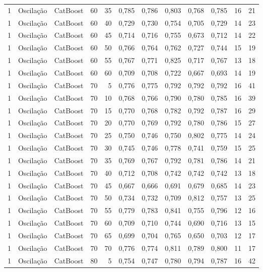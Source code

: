 \begin{longtable}{@{}rllrrrrrrrrr@{}}
1 & Oscilação & CatBoost & 60 & 35 & 0,785 & 0,786 & 0,803 & 0,768 & 0,785 & 16 & 21 \\
1 & Oscilação & CatBoost & 60 & 40 & 0,729 & 0,730 & 0,754 & 0,705 & 0,729 & 14 & 23 \\
1 & Oscilação & CatBoost & 60 & 45 & 0,714 & 0,716 & 0,755 & 0,673 & 0,712 & 14 & 22 \\
1 & Oscilação & CatBoost & 60 & 50 & 0,766 & 0,764 & 0,762 & 0,727 & 0,744 & 15 & 19 \\
1 & Oscilação & CatBoost & 60 & 55 & 0,767 & 0,771 & 0,825 & 0,717 & 0,767 & 13 & 18 \\
1 & Oscilação & CatBoost & 60 & 60 & 0,709 & 0,708 & 0,722 & 0,667 & 0,693 & 14 & 19 \\
1 & Oscilação & CatBoost & 70 & 5 & 0,776 & 0,775 & 0,792 & 0,792 & 0,792 & 16 & 41 \\
1 & Oscilação & CatBoost & 70 & 10 & 0,768 & 0,766 & 0,790 & 0,780 & 0,785 & 16 & 39 \\
1 & Oscilação & CatBoost & 70 & 15 & 0,770 & 0,768 & 0,782 & 0,792 & 0,787 & 16 & 29 \\
1 & Oscilação & CatBoost & 70 & 20 & 0,770 & 0,769 & 0,792 & 0,780 & 0,786 & 15 & 27 \\
1 & Oscilação & CatBoost & 70 & 25 & 0,750 & 0,746 & 0,750 & 0,802 & 0,775 & 14 & 24 \\
1 & Oscilação & CatBoost & 70 & 30 & 0,745 & 0,746 & 0,778 & 0,741 & 0,759 & 15 & 25 \\
1 & Oscilação & CatBoost & 70 & 35 & 0,769 & 0,767 & 0,792 & 0,781 & 0,786 & 14 & 21 \\
1 & Oscilação & CatBoost & 70 & 40 & 0,712 & 0,708 & 0,742 & 0,742 & 0,742 & 13 & 18 \\
1 & Oscilação & CatBoost & 70 & 45 & 0,667 & 0,666 & 0,691 & 0,679 & 0,685 & 14 & 23 \\
1 & Oscilação & CatBoost & 70 & 50 & 0,734 & 0,732 & 0,709 & 0,812 & 0,757 & 13 & 25 \\
1 & Oscilação & CatBoost & 70 & 55 & 0,779 & 0,783 & 0,841 & 0,755 & 0,796 & 12 & 16 \\
1 & Oscilação & CatBoost & 70 & 60 & 0,709 & 0,710 & 0,744 & 0,690 & 0,716 & 13 & 15 \\
1 & Oscilação & CatBoost & 70 & 65 & 0,699 & 0,704 & 0,765 & 0,650 & 0,703 & 12 & 17 \\
1 & Oscilação & CatBoost & 70 & 70 & 0,776 & 0,774 & 0,811 & 0,789 & 0,800 & 11 & 17 \\
1 & Oscilação & CatBoost & 80 & 5 & 0,754 & 0,747 & 0,780 & 0,794 & 0,787 & 16 & 42 \\

\end{longtable}

